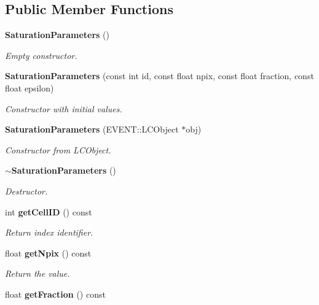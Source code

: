 \subsection*{Public Member Functions}
\begin{DoxyCompactItemize}
\item 
{\bf Saturation\-Parameters} ()\label{classCALICE_1_1SaturationParameters_a6bcce091aa42264d16ef47dcd08e821c}

\begin{DoxyCompactList}\small\item\em Empty constructor. \end{DoxyCompactList}\item 
{\bf Saturation\-Parameters} (const int id, const float npix, const float fraction, const float epsilon)\label{classCALICE_1_1SaturationParameters_ac81175a971ef70d31a35736b67f2bf21}

\begin{DoxyCompactList}\small\item\em Constructor with initial values. \end{DoxyCompactList}\item 
{\bf Saturation\-Parameters} (E\-V\-E\-N\-T\-::\-L\-C\-Object $\ast$obj)\label{classCALICE_1_1SaturationParameters_a0b239df29e12436f287567b36b0764c7}

\begin{DoxyCompactList}\small\item\em Constructor from L\-C\-Object. \end{DoxyCompactList}\item 
{\bf $\sim$\-Saturation\-Parameters} ()\label{classCALICE_1_1SaturationParameters_ad14c91e7e73ffb8760d28a4d03111e18}

\begin{DoxyCompactList}\small\item\em Destructor. \end{DoxyCompactList}\item 
int {\bf get\-Cell\-I\-D} () const \label{classCALICE_1_1SaturationParameters_a5c652e82d47d3d527bab74c7cfcfc33e}

\begin{DoxyCompactList}\small\item\em Return index identifier. \end{DoxyCompactList}\item 
float {\bf get\-Npix} () const \label{classCALICE_1_1SaturationParameters_a6c0537cf991175491fd93d925bbc5f39}

\begin{DoxyCompactList}\small\item\em Return the value. \end{DoxyCompactList}\item 
float {\bf get\-Fraction} () const \label{classCALICE_1_1SaturationParameters_a6a8d38ce8423fd0d339fb23199f7b39b}


\end{DoxyCompactItemize}
